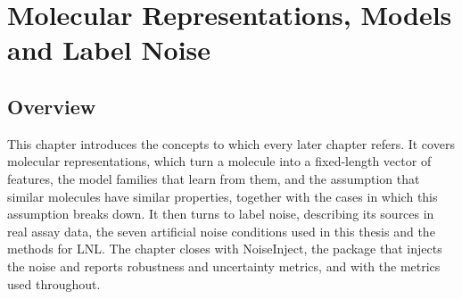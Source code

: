 \chapter{Molecular Representations, Models and Label Noise}\label{chap:background}\label{sec2}

\section{Overview}

This chapter introduces the concepts to which every later chapter refers. It covers molecular representations, which turn a molecule into a fixed-length vector of features, the model families that learn from them, and the assumption that similar molecules have similar properties, together with the cases in which this assumption breaks down. It then turns to label noise, describing its sources in real assay data, the seven artificial noise conditions used in this thesis and the methods for LNL. The chapter closes with NoiseInject, the package that injects the noise and reports robustness and uncertainty metrics, and with the metrics used throughout.




